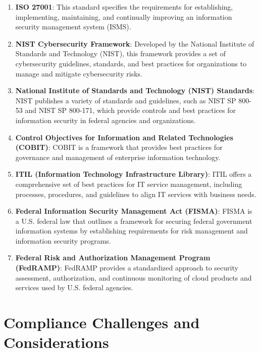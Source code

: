     \begin{enumerate}
        \item \textbf{ISO 27001}: This standard specifies the requirements for establishing, implementing, maintaining, and continually improving an information security management system (ISMS).


        \item \textbf{NIST Cybersecurity Framework}: Developed by the National Institute of Standards and Technology (NIST), this framework provides a set of cybersecurity guidelines, standards, and best practices for organizations to manage and mitigate cybersecurity risks.

        \item \textbf{National Institute of Standards and Technology (NIST) Standards}: NIST publishes a variety of standards and guidelines, such as NIST SP 800-53 and NIST SP 800-171, which provide controls and best practices for information security in federal agencies and organizations.

        \item \textbf{Control Objectives for Information and Related Technologies (COBIT)}: COBIT is a framework that provides best practices for governance and management of enterprise information technology.

        \item \textbf{ITIL (Information Technology Infrastructure Library)}: ITIL offers a comprehensive set of best practices for IT service management, including processes, procedures, and guidelines to align IT services with business needs.

        \item \textbf{Federal Information Security Management Act (FISMA)}: FISMA is a U.S. federal law that outlines a framework for securing federal government information systems by establishing requirements for risk management and information security programs.

        \item \textbf{Federal Risk and Authorization Management Program (FedRAMP)}: FedRAMP provides a standardized approach to security assessment, authorization, and continuous monitoring of cloud products and services used by U.S. federal agencies.
    \end{enumerate}

\section*{Compliance Challenges and Considerations}

